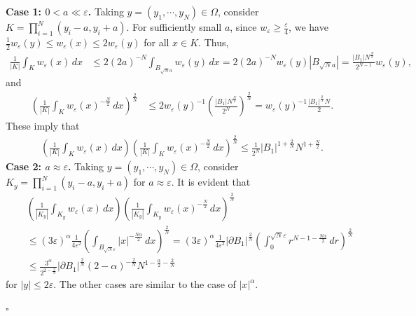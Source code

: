 \documentclass[11pt]{article}
\newenvironment{proof}{{\bf {Proof.}}}{\hfill $\square$}
\numberwithin{equation}{section}
\def\bf{\textbf}
\begin{document}
\begin{proof}
\textbf{Case 1: $0 < a \ll \varepsilon$.}
Taking $y=(y_1,\cdots,y_N)\in \Omega$, consider $K=\prod_{i=1}^N(y_i-a,y_i+a)$. For sufficiently small $a$, since $w_\varepsilon \geq \frac{\varepsilon}{4}$, we have $\frac{1}{2}w_\varepsilon(y) \leq w_\varepsilon(x) \leq 2w_\varepsilon(y)$ for all $x \in K$. Thus,
\begin{equation*}
\begin{split}
\frac{1}{|K|}\int_K w_\varepsilon(x) \, dx
&\leq 2 (2a)^{-N}\int_{B_{\sqrt{N}a}} w_\varepsilon(y) \, dx = 2(2a)^{-N} w_\varepsilon(y)|B_{\sqrt{N}a}| = \frac{|B_1|N^{\frac{N}{2}}}{2^{N-1}} w_\varepsilon(y),
\end{split}
\end{equation*}
and
\begin{equation*}
\begin{split}
\left(\frac{1}{|K|}\int_K w_\varepsilon(x)^{-\frac{N}{2}} \, dx\right)^{\frac{2}{N}}
&\leq 2w_\varepsilon(y)^{-1}\left(\frac{|B_1|N^{\frac{N}{2}}}{2^N}\right)^{\frac{2}{N}} = w_\varepsilon(y)^{-1}\frac{|B_1|^{\frac{2}{N}}N}{2}.
\end{split}
\end{equation*}
These imply that
\begin{equation*}
\begin{split}
\left(\frac{1}{|K|}\int_K w_\varepsilon(x) \, dx\right)\left(\frac{1}{|K|}\int_K w_\varepsilon(x)^{-\frac{N}{2}} \, dx\right)^{\frac{2}{N}} \leq \frac{1}{2^N}|B_1|^{1+\frac{2}{N}}N^{1+\frac{N}{2}}.
\end{split}
\end{equation*}
\textbf{Case 2: $a \approx \varepsilon$.}
Taking $y=(y_1,\cdots,y_N)\in \Omega$, consider $K_y=\prod_{i=1}^N(y_i-a,y_i+a)$ for $a \approx \varepsilon$. It is evident that
\begin{eqnarray*}
&&\left(\frac{1}{|K_y|}\int_{K_y} w_\varepsilon(x) \, dx\right)\left(\frac{1}{|K_y|}\int_{K_y} w_\varepsilon(x)^{-\frac{N}{2}} \, dx\right)^{\frac{2}{N}} \\
&&\leq (3\varepsilon)^\alpha \frac{1}{4\varepsilon^2}\left(\int_{B_{\sqrt{N}\varepsilon}}|x|^{-\frac{N\alpha}{2}} \, dx\right)^{\frac{2}{N}} = (3\varepsilon)^\alpha \frac{1}{4\varepsilon^2} |\partial B_1|^{\frac{2}{N}}\left(\int_0^{\sqrt{N}\varepsilon} r^{N-1-\frac{N\alpha}{2}} \, dr\right)^{\frac{2}{N}} \\
&&\leq \frac{3^\alpha}{2^{2-\frac{2}{N}}}|\partial B_1|^{\frac{2}{N}} (2-\alpha)^{-\frac{2}{N}}N^{1-\frac{\alpha}{2}-\frac{2}{N}}
\end{eqnarray*}
for $|y| \leq 2\varepsilon$. The other cases are similar to the case of $|x|^\alpha$.


\end{proof}
\end{document}
